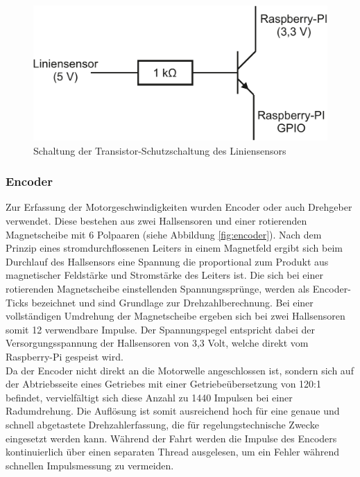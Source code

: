 \documentclass[12pt,a4paper,oneside]{article}
\begin{document}
\begin{spacing}{1.15}
\begin{figure}[!htb]
	\centering
	\includegraphics[scale=.3]{figs/transistor}
	\caption{Schaltung der Transistor-Schutzschaltung des Liniensensors}
	\label{fig:transistor}
\end{figure}

\subsubsection{Encoder}

Zur Erfassung der Motorgeschwindigkeiten wurden Encoder oder auch Drehgeber verwendet. Diese bestehen aus zwei Hallsensoren und einer rotierenden Magnetscheibe mit 6 Polpaaren (siehe Abbildung \ref{fig:encoder}). Nach dem Prinzip eines stromdurchflossenen Leiters in einem Magnetfeld ergibt sich beim Durchlauf des Hallsensors eine Spannung die proportional zum Produkt aus magnetischer Feldstärke und Stromstärke des Leiters ist. Die sich bei einer rotierenden Magnetscheibe einstellenden Spannungssprünge, werden als Encoder-Ticks bezeichnet und sind Grundlage zur Drehzahlberechnung. Bei einer vollständigen Umdrehung der Magnetscheibe ergeben sich bei zwei Hallsensoren somit 12 verwendbare Impulse. Der Spannungspegel entspricht dabei der Versorgungsspannung der Hallsensoren von 3,3 Volt, welche direkt vom Raspberry-Pi gespeist wird.\\ 
Da der Encoder nicht direkt an die Motorwelle angeschlossen ist, sondern sich auf der Abtriebsseite eines Getriebes mit einer Getriebeübersetzung von 120:1 befindet, vervielfältigt sich diese Anzahl zu 1440 Impulsen bei einer Radumdrehung. Die Auflösung ist somit ausreichend hoch für eine genaue und schnell abgetastete Drehzahlerfassung, die für regelungstechnische Zwecke eingesetzt werden kann. Während der Fahrt werden die Impulse des Encoders kontinuierlich über einen separaten Thread ausgelesen, um ein Fehler während schnellen Impulsmessung zu vermeiden.


\end{spacing}
\end{document}
